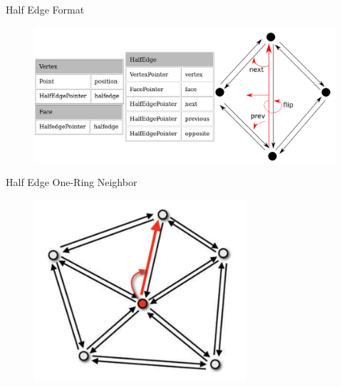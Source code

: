 \documentclass{beamer}
\begin{document}
\begin{frame}{Half Edge Format}

\begin{figure}[t]
    \includegraphics[width=\textwidth]{HalfEdgeIllustration.png}
\end{figure}


\end{frame}

\begin{frame}{Half Edge One-Ring Neighbor}

\begin{figure}[t]
    \includegraphics[width=0.7\textwidth]{HalfEdgeOneRing.png}
\end{figure}

\end{frame}
\end{document}
